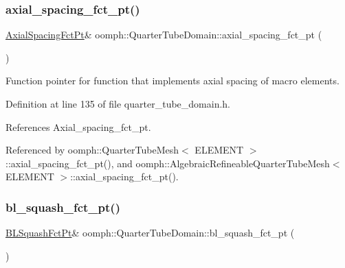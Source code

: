 \mbox{\label{classoomph_1_1QuarterTubeDomain_a05cf314c7317632829f96a30fee24cde}} 
\subsubsection{\texorpdfstring{axial\+\_\+spacing\+\_\+fct\+\_\+pt()}{axial\_spacing\_fct\_pt()}}
{\footnotesize\ttfamily \hyperlink{classoomph_1_1QuarterTubeDomain_ae347af42a5dcb9b3b82c2247975b01db}{Axial\+Spacing\+Fct\+Pt}\& oomph\+::\+Quarter\+Tube\+Domain\+::axial\+\_\+spacing\+\_\+fct\+\_\+pt (\begin{DoxyParamCaption}{ }\end{DoxyParamCaption})\hspace{0.3cm}{\ttfamily [inline]}}



Function pointer for function that implements axial spacing of macro elements. 



Definition at line 135 of file quarter\+\_\+tube\+\_\+domain.\+h.



References Axial\+\_\+spacing\+\_\+fct\+\_\+pt.



Referenced by oomph\+::\+Quarter\+Tube\+Mesh$<$ E\+L\+E\+M\+E\+N\+T $>$\+::axial\+\_\+spacing\+\_\+fct\+\_\+pt(), and oomph\+::\+Algebraic\+Refineable\+Quarter\+Tube\+Mesh$<$ E\+L\+E\+M\+E\+N\+T $>$\+::axial\+\_\+spacing\+\_\+fct\+\_\+pt().

\mbox{\label{classoomph_1_1QuarterTubeDomain_a11251924a7d83e09208138b3bedba160}} 
\subsubsection{\texorpdfstring{bl\+\_\+squash\+\_\+fct\+\_\+pt()}{bl\_squash\_fct\_pt()}}
{\footnotesize\ttfamily \hyperlink{classoomph_1_1QuarterTubeDomain_a3d8c15c17d9912d8c519c028437c0b2c}{B\+L\+Squash\+Fct\+Pt}\& oomph\+::\+Quarter\+Tube\+Domain\+::bl\+\_\+squash\+\_\+fct\+\_\+pt (\begin{DoxyParamCaption}{ }\end{DoxyParamCaption})\hspace{0.3cm}{\ttfamily [inline]}}




